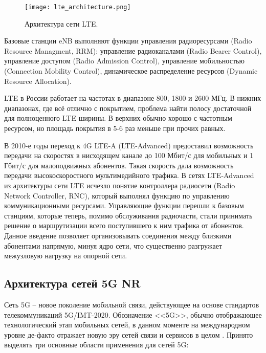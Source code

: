 
\begin{figure}[h!]
  \centering
   \texttt{[image: lte\_architecture.png]}
\caption{Архитектура сети LTE.}
\label{fig:part1_lte_architecture}
\end{figure}

Базовые станции eNB выполняют функции управления радиоресурсами (Radio Resource Managment, RRM): управление радиоканалами (Radio Bearer Control), управление доступом (Radio Admission Control), управление мобильностью (Connection Mobility Control), динамическое распределение ресурсов (Dynamic Resource Allocation).

LTE в России работает на частотах в диапазоне 800, 1800 и 2600 МГц. В нижних диапазонах, где всё отлично с покрытием, проблема найти полосу достаточной для полноценного LTE ширины. В верхних обычно хорошо с частотным ресурсом, но площадь покрытия в 5-6 раз меньше при прочих равных. 

В 2010-е годы переход к 4G LTE-A (LTE-Advanced) предоставил возможность передачи на скоростях в нисходящем канале до 100 Мбит/с для мобильных и 1 Гбит/с для малоподвижных абонентов. Такая скорость дала возможность передачи высокоскоростного мультимедийного трафика. В сетях LTE-Advanced из архитектуры сети LTE исчезло понятие контроллера радиосети (Radio Network Controller, RNC), который выполнял функцию по управлению коммуникационными ресурсами. Управляющие функции перешли к базовым станциям, которые теперь, помимо обслуживания радиочасти, стали принимать решение о маршрутизации всего поступившего к ним трафика от абонентов. Данное введение позволяет организовывать соединения между близкими абонентами напрямую, минуя ядро сети, что существенно разгружает межузловую нагрузку на опорной сети. 


\subsection{Архитектура сетей  5G NR}
Сеть 5G -- новое поколение мобильной связи, действующее на основе стандартов телекоммуникаций 5G/IMT-2020. Обозначение <<5G>>, обычно отображающее технологический этап мобильных сетей, в данном моменте на международном уровне де-факто отражает новую эру сетей связи и сервисов в целом \cite{Koucheryavy}. Принято выделять три основные области применения для сетей 5G:

